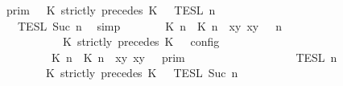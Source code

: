 \begin{isabellebody}
\ \ \ \ \ \ \ \ {\isacharequal}\ {\isasymlbrakk}{\isasymlbrakk}\ {\isasymGamma}\ {\isasymrbrakk}{\isasymrbrakk}\isactrlsub p\isactrlsub r\isactrlsub i\isactrlsub m\ {\isasyminter}\ {\isasymlbrakk}{\isasymlbrakk}\ {\isacharparenleft}K\ strictly\ precedes\ K\ {\isacharhash}\ {\isasymPsi}\ {\isasymrbrakk}{\isasymrbrakk}\isactrlsub T\isactrlsub E\isactrlsub S\isactrlsub L\isactrlbsup {\isasymge}\ n\isactrlesup \isanewline
\ \ \ \ \ \ \ \ \ \ {\isasyminter}\ {\isasymlbrakk}{\isasymlbrakk}\ {\isasymPhi}\ {\isasymrbrakk}{\isasymrbrakk}\isactrlsub T\isactrlsub E\isactrlsub S\isactrlsub L\isactrlbsup {\isasymge}\ Suc\ n\isactrlesup {\isacartoucheclose}\ \isamarkupfalse%
\ simp\isanewline
\ \ \isamarkupfalse%
\ \isamarkupfalse%
\ {\isacartoucheopen}{\isasymlbrakk}\ {\isacharparenleft}{\isacharparenleft}{\isasymlceil}{\isacharhash}\isactrlsup {\isasymle}\ K\ n{\isacharcomma}\ {\isacharhash}\isactrlsup {\isacharless}\ K\ n{\isasymrceil}\ {\isasymin}\ {\isacharparenleft}{\isasymlambda}{\isacharparenleft}x{\isacharcomma}y{\isacharparenright}{\isachardot}\ x{\isasymle}y{\isacharparenright}{\isacharparenright}\ {\isacharhash}\ {\isasymGamma}{\isacharparenright}{\isacharcomma}\ n\isanewline
\ \ \ \ \ \ \ \ \ \ \ \ \ \ \ \ \ \ {\isasymturnstile}\ {\isasymPsi}\ {\isasymtriangleright}\ {\isacharparenleft}{\isacharparenleft}K\ strictly\ precedes\ K\ {\isacharhash}\ {\isasymPhi}{\isacharparenright}\ {\isasymrbrakk}\isactrlsub c\isactrlsub o\isactrlsub n\isactrlsub f\isactrlsub i\isactrlsub g\isanewline
\ \ \ \ \ \ \ \ \ \ \ \ \ \ \ \ {\isacharequal}\ {\isasymlbrakk}{\isasymlbrakk}\ {\isacharparenleft}{\isasymlceil}{\isacharhash}\isactrlsup {\isasymle}\ K\ n{\isacharcomma}\ {\isacharhash}\isactrlsup {\isacharless}\ K\ n{\isasymrceil}\ {\isasymin}\ {\isacharparenleft}{\isasymlambda}{\isacharparenleft}x{\isacharcomma}y{\isacharparenright}{\isachardot}\ x{\isasymle}y{\isacharparenright}{\isacharparenright}\ {\isacharhash}\ {\isasymGamma}\ {\isasymrbrakk}{\isasymrbrakk}\isactrlsub p\isactrlsub r\isactrlsub i\isactrlsub m\isanewline
\ \ \ \ \ \ \ \ \ \ \ \ \ \ \ \ {\isasyminter}\ {\isasymlbrakk}{\isasymlbrakk}\ {\isasymPsi}\ {\isasymrbrakk}{\isasymrbrakk}\isactrlsub T\isactrlsub E\isactrlsub S\isactrlsub L\isactrlbsup {\isasymge}\ n\isactrlesup \isanewline
\ \ \ \ \ \ \ \ \ \ \ \ \ \ \ \ {\isasyminter}\ {\isasymlbrakk}{\isasymlbrakk}\ {\isacharparenleft}K\ strictly\ precedes\ K\ {\isacharhash}\ {\isasymPhi}\ {\isasymrbrakk}{\isasymrbrakk}\isactrlsub T\isactrlsub E\isactrlsub S\isactrlsub L\isactrlbsup {\isasymge}\ Suc\ n\isactrlesup {\isacartoucheclose}\ \isamarkupfalse%

\end{isabellebody}
